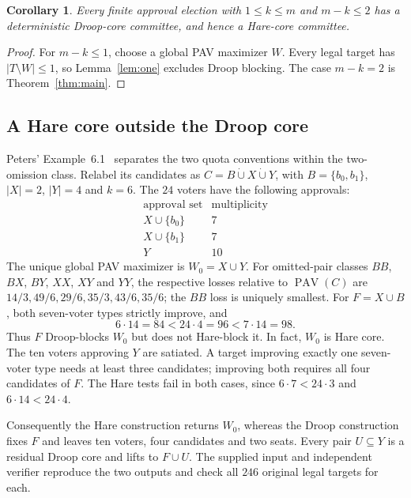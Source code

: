 \documentclass[11pt]{article}
\newtheorem{corollary}[theorem]{Corollary}
\newcommand{\PAV}{\operatorname{PAV}}
\begin{document}
\begin{corollary}\label{cor:atmosttwo}
Every finite approval election with $1\le k\le m$ and $m-k\le2$
has a deterministic Droop-core committee, and hence a Hare-core committee.
\end{corollary}
\begin{proof}
For $m-k\le1$, choose a global PAV maximizer $W$.
Every legal target has $|T\setminus W|\le1$, so Lemma~\ref{lem:one}
excludes Droop blocking. The case $m-k=2$ is Theorem~\ref{thm:main}.
\end{proof}

\subsection{A Hare core outside the Droop core}\label{sec:distinction}
Peters' Example~6.1~\cite{Peters2025} separates the two quota conventions
within the two-omission class. Relabel its candidates as
$C=B\mathbin{\dot\cup}X\mathbin{\dot\cup}Y$, with
$B=\{b_0,b_1\}$, $|X|=2$, $|Y|=4$ and $k=6$.
The $24$ voters have the following approvals:
\[
\begin{array}{c|r}
\text{approval set}&\text{multiplicity}\\ \hline
X\cup\{b_0\}&7\\
X\cup\{b_1\}&7\\
Y&10
\end{array}
\]
The unique global PAV maximizer is $W_0=X\cup Y$.
For omitted-pair classes $BB$, $BX$, $BY$, $XX$, $XY$ and $YY$, the respective losses
relative to $\PAV(C)$ are $14/3,49/6,29/6,35/3,43/6,35/6$;
the $BB$ loss is uniquely smallest.
For $F=X\cup B$, both seven-voter types strictly improve, and
\[
 6\cdot14=84<24\cdot4=96<7\cdot14=98.
\]
Thus $F$ Droop-blocks $W_0$ but does not Hare-block it.
In fact, $W_0$ is Hare core. The ten voters approving $Y$ are
satiated. A target improving exactly one seven-voter type needs at
least three candidates; improving both requires all four candidates of $F$.
The Hare tests fail in both cases, since $6\cdot7<24\cdot3$ and
$6\cdot14<24\cdot4$.

Consequently the Hare construction returns $W_0$, whereas the Droop
construction fixes $F$ and leaves ten voters, four candidates and two seats.
Every pair $U\subseteq Y$ is a residual Droop core and lifts to
$F\cup U$. The supplied input and independent verifier reproduce the
two outputs and check all $246$ original legal targets for each.
\end{document}
